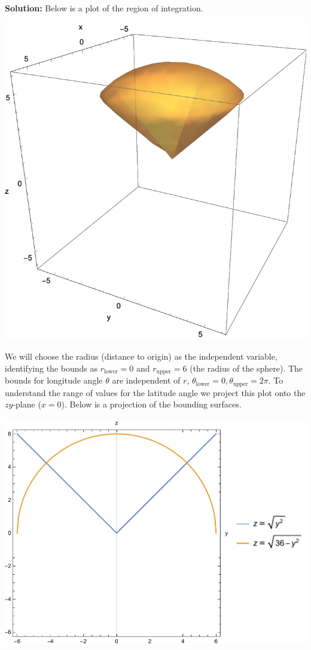 \documentclass[12pt,oneside]{exam}
\newenvironment{newsolution}{\vspace{.1in}\noindent\textbf{Solution: \hspace{.05em}}}{}
\begin{document}
\begin{newsolution}
Below is a plot of the region of integration.
\begin{center}
\includegraphics[scale=0.5]{p11.pdf}
\end{center}
We will choose the radius (distance to origin) as the independent variable, identifying the bounds as $r_{\mathrm{lower}}=0$ and $r_{\mathrm{upper}}=6$ (the radius of the sphere). The bounds for longitude angle $\theta$ are independent of $r$, $\theta_{\mathrm{lower}}=0, \theta_{\mathrm{upper}}=2\pi$. To understand the range of values for the latitude angle we project this plot onto the $zy$-plane ($x=0$). Below is a projection of the bounding surfaces.
\begin{center}
\includegraphics[scale=0.5]{p12.pdf}

\end{center}
\end{newsolution}
\end{document}
